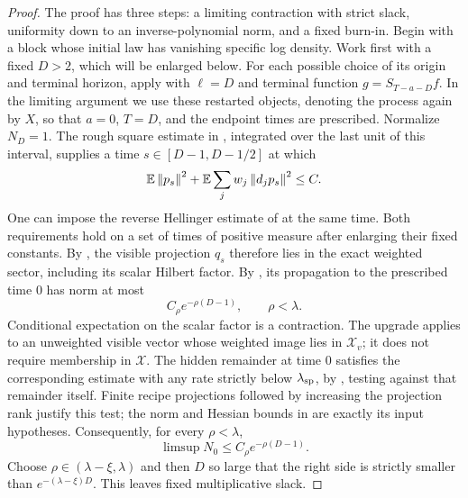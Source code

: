 \begin{proof}
The proof has three steps: a limiting contraction with strict slack,
uniformity down to an inverse-polynomial norm, and a fixed burn-in.
Begin with a block whose initial law has vanishing specific log density.
Work first with a fixed $D>2$, which will be enlarged below.
For each possible choice of its origin and terminal horizon, apply
 with $\ell=D$ and terminal function
$g=S_{T-a-D}f$.  In the limiting argument we use these restarted
objects, denoting the process again by $X$, so that $a=0$, $T=D$,
and the endpoint times are prescribed.  Normalize $N_D=1$.
The rough square estimate in , integrated over
the last unit of this interval, supplies a time
$s\in[D-1,D-1/2]$ at which
\begin{equation}
 \mathbb E\left\lVert p_s\right\rVert^2+
 \mathbb E\sum_jw_j\left\lVert d_jp_s\right\rVert^2\le C.
 \label{eq:cutoff-good-time}
\end{equation}
One can impose the reverse Hellinger estimate of
 at the same time.  Both requirements hold
on a set of times of positive measure after enlarging their fixed
constants.  By , the visible projection
$q_s$ therefore lies in the exact weighted sector, including its
scalar Hilbert factor.  By
, its
propagation to the prescribed time $0$ has norm
at most
\[
 C_\rho e^{-\rho(D-1)},\qquad \rho<\lambda.
\]
Conditional expectation on the scalar factor is a contraction.  The
upgrade applies to an unweighted visible vector whose weighted image
lies in $\mathcal X_v$; it does not require membership in
$\mathcal X$.  The hidden remainder at time $0$ satisfies the corresponding estimate
with any rate strictly below $\lambda_{\rm sp}$, by
, testing against that remainder itself.
Finite recipe projections followed by increasing the projection rank
justify this test; the norm and Hessian bounds in
 are exactly its input hypotheses.
Consequently, for every $\rho<\lambda$,
\begin{equation}
 \limsup N_0\le C_\rho e^{-\rho(D-1)}.
 \label{eq:cutoff-limiting-block}
\end{equation}
Choose $\rho\in(\lambda-\xi,\lambda)$ and then $D$ so large that the
right side is strictly smaller than $e^{-(\lambda-\xi)D}$.
This leaves fixed multiplicative slack.


\end{proof}
